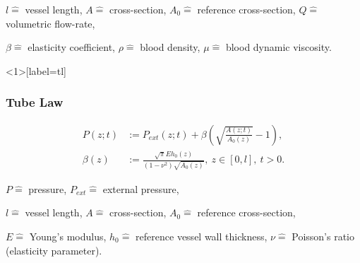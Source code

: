 \documentclass{beamer}
\begin{document}
\begin{frame}
{		$l \hat{=}$ vessel length,
		$A \hat{=}$ cross-section,
		$A_0 \hat{=}$ reference cross-section,
		$Q \hat{=}$ volumetric flow-rate,

		$\beta \hat{=}$ elasticity coefficient,
		$\rho \hat{=}$ blood density,
		$\mu \hat{=}$ blood dynamic viscosity. 
	\par}




\end{frame}


\begin{frame}<1>[label=tl]
	\frametitle{Tube Law}
	\begin{align}
		P(z;t) &:= P_{ext}(z;t) + \beta \left( \sqrt{\frac{A(z;t)}{A_0(z)}}-1 \right),      \label{eq:p_tot}\\
		\beta(z) &:=  \frac{\sqrt{\pi} E h_0(z)}{(1-\nu^2) \sqrt{A_0(z)}},\  z \in \left[ 0,l \right], \ t > 0. 
	\end{align}

	\vfill

	{\tiny \centering 
		$P \hat{=}$ pressure,
		$P_{ext} \hat{=}$ external pressure,

		$l \hat{=}$ vessel length,
		$A \hat{=}$ cross-section,
		$A_0 \hat{=}$ reference cross-section,

		$E \hat{=}$ Young's modulus,
		$h_0 \hat{=}$ reference vessel wall thickness,
		$\nu \hat{=}$ Poisson's ratio (elasticity parameter). 
	\par}
\end{frame}
\end{document}
